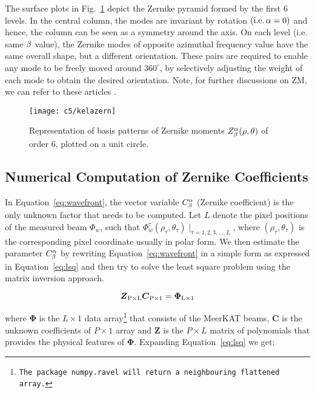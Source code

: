 The surface plots in Fig.~\ref{fig:d_indx} depict the Zernike pyramid formed by the first $6$ levels. In the central column, the modes are invariant by rotation $(\text{i.e.} \, \rm \alpha=0)$ and hence, the column can be seen as a symmetry around the axis. On each level (i.e. same $\rm \beta$ value), the Zernike modes of opposite azimuthal frequency value have the same overall shape, but a different orientation. These pairs are required to enable any mode to be freely moved around $360^\circ$, by selectively adjusting the weight of each mode to obtain the desired orientation. Note, for further discussions on ZM, we can refer to these articles \citep{campbell2003new,lakshminarayanan2011zernike,1976JOSA...66..207N,wyant1992basic}.


\begin{figure}
\begin{minipage}[H]{\linewidth}
\centering
\texttt{[image: c5/kelazern]}
\end{minipage}
\caption{\label{fig:d_indx} Representation of basis patterns of Zernike moments $Z_{\rm \beta}^{\rm \alpha}(\rho,\theta)$ of order $6$, plotted on a unit circle.}
\end{figure}
\FloatBarrier

\subsection{Numerical Computation of Zernike Coefficients}	   \label{chap5:zcoff}
In Equation~\ref{eq:wavefront}, the vector variable $C_{\rm \beta}^{\rm \alpha}$ (Zernike coefficient) is the only unknown factor that needs to be computed. 
Let $L$ denote the pixel positions of the measured beam $\Phi_{w}$, such that $\Phi_{w}^{\tau}(\rho_{\tau},\theta_{\tau})\mid_{\tau = 1,2,3,\ldots,L}$, where
$(\rho_{\tau},\theta_{\tau})$ is the corresponding pixel coordinate usually in polar form.  We then estimate the parameter $C_{\rm \beta}^{\rm \alpha}$ 
by rewriting Equation~\ref{eq:wavefront} in a simple form as expressed in Equation~\ref{eq:lsq} and then try to solve the least square problem using 
the matrix inversion approach. 

\begin{equation}\label{eq:lsq}
 \boldsymbol{Z}_{\rm P \times L} \boldsymbol{C}_{\rm P \times 1} = \boldsymbol{\Phi}_{\rm L \times 1}
\end{equation}

\noindent where $\bm{\Phi}$ is the $L \times 1$ data array\footnote{{\tt The package numpy.ravel will return a neighbouring flattened array.}} that consists of  
the MeerKAT beams, $\bm{C}$ is the unknown coefficients of $ P \times 1$ array and  $\bm{Z}$ is the $P \times L$ matrix of polynomials that  provides 
the physical features of $\bm{\Phi}$. Expanding Equation~\ref{eq:lsq} we get;

